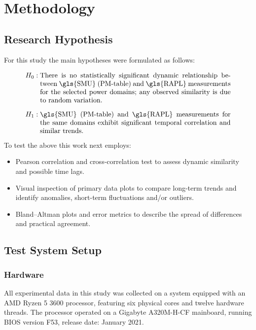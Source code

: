 \section{Methodology}

\subsection{Research Hypothesis}
\label{sec:hypo}

For this study the main hypotheses were formulated as follows:

\begin{align*}
H_{0}&: 
\begin{minipage}[t]{0.8\linewidth}
There is no statistically significant dynamic relationship between
\gls{SMU} (PM-table) and \gls{RAPL} measurements for the
selected power domains; any observed similarity
is due to random variation.
\end{minipage}\\[0.8em]
H_{1}&:
\begin{minipage}[t]{0.8\linewidth}
\gls{SMU} (PM-table) and \gls{RAPL} measurements for the same domains
exhibit significant temporal correlation and similar trends.
\end{minipage}
\end{align*}

To test the above this work next employs:
\begin{itemize}
  \item Pearson correlation and cross-correlation test to assess dynamic
        similarity and possible time lags.
  \item Visual inspection of primary data plots to compare long-term trends
        and identify anomalies, short-term fluctuations and/or outliers.
  \item Bland–Altman plots and error metrics to describe the spread of
        differences and practical agreement.
\end{itemize}

\subsection{Test System Setup}

\subsubsection{Hardware}

All experimental data in this study was collected on a system equipped with an
AMD Ryzen 5 3600 processor, featuring six physical cores and twelve hardware
threads. The processor operated on a Gigabyte A320M-H-CF mainboard, running
\gls{BIOS} version F53, release date: January 2021.

